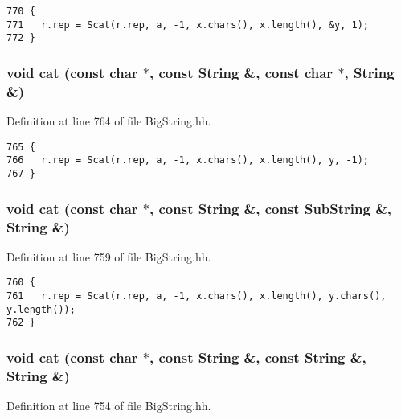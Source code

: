 \footnotesize\begin{verbatim}770 {
771   r.rep = Scat(r.rep, a, -1, x.chars(), x.length(), &y, 1);
772 }
\end{verbatim}\normalsize 
{}
\subsubsection{\setlength{\rightskip}{0pt plus 5cm}void cat (const char $\ast$, const String \&, const char $\ast$, String \&)\hspace{0.3cm}{\tt  [friend]}}\label{classString_l27}




Definition at line 764 of file Big\-String.hh.



\footnotesize\begin{verbatim}765 {
766   r.rep = Scat(r.rep, a, -1, x.chars(), x.length(), y, -1);
767 }
\end{verbatim}\normalsize 
{}
\subsubsection{\setlength{\rightskip}{0pt plus 5cm}void cat (const char $\ast$, const String \&, const {\bf Sub\-String} \&, String \&)\hspace{0.3cm}{\tt  [friend]}}\label{classString_l26}




Definition at line 759 of file Big\-String.hh.



\footnotesize\begin{verbatim}760 {
761   r.rep = Scat(r.rep, a, -1, x.chars(), x.length(), y.chars(), y.length());
762 }
\end{verbatim}\normalsize 
{}
\subsubsection{\setlength{\rightskip}{0pt plus 5cm}void cat (const char $\ast$, const String \&, const String \&, String \&)\hspace{0.3cm}{\tt  [friend]}}\label{classString_l25}




Definition at line 754 of file Big\-String.hh.



